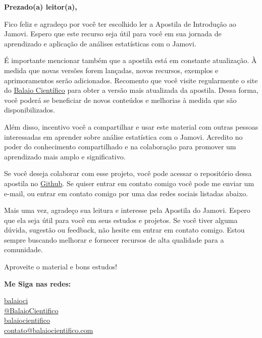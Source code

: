 
\begin{flushleft}
\Huge\textbf{Prezado(a) leitor(a),}
\end{flushleft}

Fico feliz e agradeço por você ter escolhido ler a Apostila de Introdução ao Jamovi. Espero que este recurso seja útil para você em sua jornada de aprendizado e aplicação de análises estatísticas com o Jamovi.

É importante mencionar também que a apostila está em constante atualização. À medida que novas versões forem lançadas, novos recursos, exemplos e aprimoramentos serão adicionados. Recomento que você visite regularmente o site do \href{https://www.balaiocientifico.com/jamovi/apostila-de-jamovi/?utm_source=apostila_jamovi&utm_medium=pdf} {Balaio Científico} para obter a versão mais atualizada da apostila. Dessa forma, você poderá se beneficiar de novos conteúdos e melhorias à medida que são disponibilizados.

Além disso, incentivo você a compartilhar e usar este material com outras pessoas interessadas em aprender sobre análise estatística com o Jamovi. Acredito no poder do conhecimento compartilhado e na colaboração para promover um aprendizado mais amplo e significativo.

Se você deseja colaborar com esse projeto, você pode acessar o repositório dessa apostila no \href{https://github.com/erickfaria/apostilaJamovi}{Github}. Se quiser entrar em contato comigo você pode me enviar um e-mail, ou entrar em contato comigo por uma das redes sociais listadas abaixo.

Mais uma vez, agradeço sua leitura e interesse pela Apostila do Jamovi. Espero que ela seja útil para você em seus estudos e projetos. Se você tiver alguma dúvida, sugestão ou feedback, não hesite em entrar em contato comigo. Estou sempre buscando melhorar e fornecer recursos de alta qualidade para a comunidade.

Aproveite o material e bons estudos!

\vfill

\noindent \textbf{Me Siga nas redes:}

\noindent \faTwitter{} \href{https://twitter.com/balaioci}{balaioci} \\
\faYoutube{} \href{https://www.youtube.com/@BalaioCientifico}{@BalaioCientifico} \\
\faInstagram{} \href{https://www.instagram.com/balaiocientifico/}{balaiocientifico} \\
\faEnvelope{} \href{mailto:contato@balaiocientifico.com}{contato@balaiocientifico.com}\\

